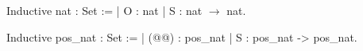 Inductive nat : Set :=
| O : nat
| S : nat $\rightarrow$ nat.

Inductive pos_nat : Set :=
| (@@) : pos_nat
| S : pos_nat -> pos_nat.


